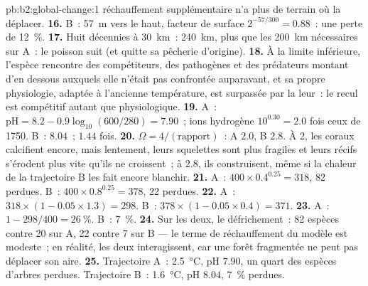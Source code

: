 \begin{solution}{pb:b2:global-change:1}
réchauffement supplémentaire n'a plus de terrain où la déplacer.
\textbf{16.} B~: \qty{57}{m} vers le haut, facteur de surface
$2^{-57/300} = 0.88$~: une perte de \qty{12}{\%}.
\textbf{17.} Huit décennies à \qty{30}{km}~: \qty{240}{km}, plus que les
\qty{200}{km} nécessaires sur A~: le poisson suit (et quitte sa pêcherie
d'origine).
\textbf{18.} À la limite inférieure, l'espèce rencontre des compétiteurs,
des pathogènes et des prédateurs montant d'en dessous auxquels elle
n'était pas confrontée auparavant, et sa propre physiologie, adaptée à
l'ancienne température, est surpassée par la leur~: le recul est
compétitif autant que physiologique.
\textbf{19.} A~: $\mathrm{pH} = 8.2 - 0.9\log_{10}(600/280) = 7.90$~;
ions hydrogène $10^{0.30} = 2.0$ fois ceux de 1750. B~: $8.04$~; $1.44$
fois.
\textbf{20.} $\Omega = 4/(\text{rapport})$~: A $2.0$, B $2.8$. À 2, les
coraux calcifient encore, mais lentement, leurs squelettes sont plus
fragiles et leurs récifs s'érodent plus vite qu'ils ne croissent~; à
$2.8$, ils construisent, même si la chaleur de la trajectoire B les fait
encore blanchir.
\textbf{21.} A~: $400\times 0.4^{0.25} = 318$, 82 perdues. B~:
$400\times 0.8^{0.25} = 378$, 22 perdues.
\textbf{22.} A~: $318\times(1 - 0.05\times 1.3) = 298$. B~:
$378\times(1 - 0.05\times 0.4) = 371$.
\textbf{23.} A~: $1 - 298/400 = \qty{26}{\%}$. B~: \qty{7}{\%}.
\textbf{24.} Sur les deux, le défrichement~: 82 espèces contre 20 sur A,
22 contre 7 sur B --- le terme de réchauffement du modèle est modeste~; en
réalité, les deux interagissent, car une forêt fragmentée ne peut pas
déplacer son aire.
\textbf{25.} Trajectoire A~: \qty{2.5}{\celsius}, pH $7.90$, un quart des
espèces d'arbres perdues. Trajectoire B~: \qty{1.6}{\celsius}, pH $8.04$,
\qty{7}{\%} perdues.
\end{solution}
